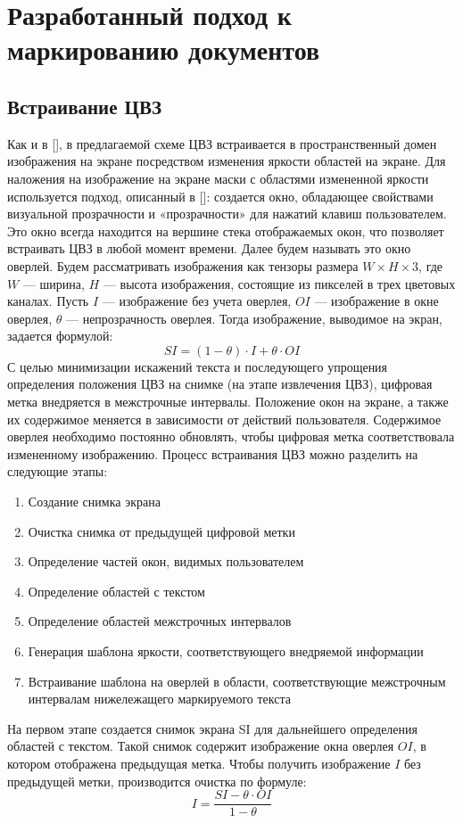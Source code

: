 \documentclass[12pt,a4paper]{article}
\begin{document}
\newpage
\section{Разработанный подход к маркированию документов}
\subsection{Встраивание ЦВЗ}
Как и в [], в предлагаемой схеме ЦВЗ встраивается в пространственный домен изображения на экране посредством изменения яркости областей на экране.
Для наложения на изображение на экране маски с областями измененной яркости используется подход, описанный в []: создается окно, обладающее свойствами визуальной прозрачности и «прозрачности» для нажатий клавиш пользователем.
Это окно всегда находится на вершине стека отображаемых окон, что позволяет встраивать ЦВЗ в любой момент времени.
Далее будем называть это окно оверлей. 
Будем рассматривать изображения как тензоры размера $W\times H\times 3$, где $W$ — ширина, $H$ — высота изображения, состоящие из пикселей в трех цветовых каналах. Пусть $I$ — изображение без учета оверлея, $OI$ — изображение в окне оверлея, $\theta$ — непрозрачность оверлея.
Тогда изображение, выводимое на экран, задается формулой:
$$SI = (1-\theta)\cdot I+\theta \cdot OI$$
С целью минимизации искажений текста и последующего упрощения определения положения ЦВЗ на снимке (на этапе извлечения ЦВЗ), цифровая метка внедряется в межстрочные интервалы.
Положение окон на экране, а также их содержимое меняется в зависимости от действий пользователя.
Содержимое оверлея необходимо постоянно обновлять, чтобы цифровая метка соответствовала измененному изображению.
Процесс встраивания ЦВЗ можно разделить на следующие этапы:
\begin{enumerate}
\item
Создание снимка экрана
\item
Очистка снимка от предыдущей цифровой метки
\item
Определение частей окон, видимых пользователем
\item
Определение областей с текстом
\item
Определение областей межстрочных интервалов
\item
Генерация шаблона яркости, соответствующего внедряемой информации
\item
Встраивание шаблона на оверлей в области, соответствующие межстрочным интервалам нижележащего маркируемого текста
\end{enumerate}
На первом этапе создается снимок экрана SI для дальнейшего определения областей с текстом.
Такой снимок содержит изображение окна оверлея $OI$, в котором отображена предыдущая метка.
Чтобы получить изображение $I$ без предыдущей метки, производится очистка по формуле:
$$I = \frac{SI- \theta\cdot OI}{1-\theta}$$
\end{document}
